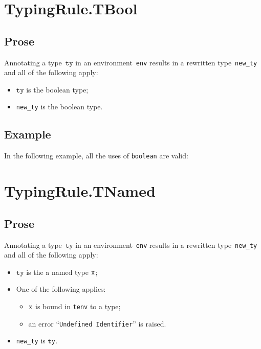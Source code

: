 \documentclass{book}
\newcommand\tty[0]{\texttt{ty}}
\begin{document}
\begin{itemize}




\section{TypingRule.TBool \label{sec:TypingRule.TBool}}

\subsection{Prose}
Annotating a type~$\tty$ in an environment~\texttt{env} results in a
rewritten type~\texttt{new\_ty} and all of the following apply:
\begin{itemize}
  \item $\tty$ is the boolean type;
  \item \texttt{new\_ty} is the boolean type.
\end{itemize}

\subsection{Example}
In the following example, all the uses of \texttt{boolean} are valid:






\section{TypingRule.TNamed \label{sec:TypingRule.TNamed}}

\subsection{Prose}
Annotating a type~$\tty$ in an environment~\texttt{env} results in a
rewritten type~\texttt{new\_ty} and all of the following apply:
\begin{itemize}
  \item $\tty$ is the a named type $\texttt{x}$;
  \item One of the following applies:
    \begin{itemize}
      \item $\texttt{x}$ is bound in \texttt{tenv} to a type;
      \item an error ``\texttt{Undefined Identifier}'' is raised.
    \end{itemize}
  \item \texttt{new\_ty} is $\tty$.
\end{itemize}


\end{itemize}
\end{document}
